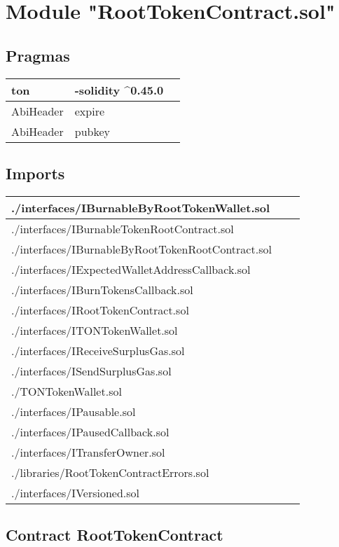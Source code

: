
\section{Module "RootTokenContract.sol"}


\subsection{Pragmas}


\noindent\begin{tabular}{|l|l|p{5cm}|}\hline
ton & -solidity \^{}0.45.0 &\\\hline
AbiHeader &  expire &\\\hline
AbiHeader &  pubkey &\\\hline
\end{tabular}


\subsection{Imports}


\noindent\begin{tabular}{|l|l|p{5cm}|}\hline
./interfaces/IBurnableByRootTokenWallet.sol &\\\hline
./interfaces/IBurnableTokenRootContract.sol &\\\hline
./interfaces/IBurnableByRootTokenRootContract.sol &\\\hline
./interfaces/IExpectedWalletAddressCallback.sol &\\\hline
./interfaces/IBurnTokensCallback.sol &\\\hline
./interfaces/IRootTokenContract.sol &\\\hline
./interfaces/ITONTokenWallet.sol &\\\hline
./interfaces/IReceiveSurplusGas.sol &\\\hline
./interfaces/ISendSurplusGas.sol &\\\hline
./TONTokenWallet.sol &\\\hline
./interfaces/IPausable.sol &\\\hline
./interfaces/IPausedCallback.sol &\\\hline
./interfaces/ITransferOwner.sol &\\\hline
./libraries/RootTokenContractErrors.sol &\\\hline
./interfaces/IVersioned.sol &\\\hline
\end{tabular}


\subsection{Contract RootTokenContract}


